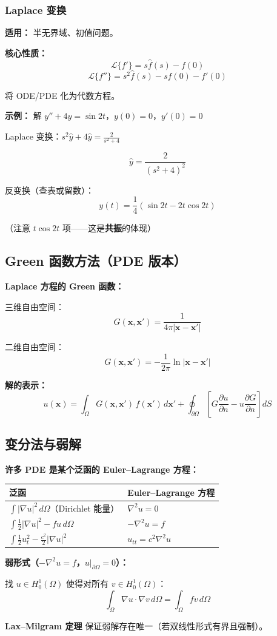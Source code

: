 \subsubsection{Laplace 变换}

\textbf{适用：} 半无界域、初值问题。

\textbf{核心性质：}
\[
\mathcal{L}\{f'\} = s\hat{f}(s) - f(0)
\]
\[
\mathcal{L}\{f''\} = s^2\hat{f}(s) - sf(0) - f'(0)
\]

将 ODE/PDE 化为代数方程。

\textbf{示例：} 解 $y'' + 4y = \sin 2t$，$y(0) = 0$，$y'(0) = 0$

Laplace 变换：$s^2\hat{y} + 4\hat{y} = \frac{2}{s^2+4}$

\[
\hat{y} = \frac{2}{(s^2+4)^2}
\]

反变换（查表或留数）：
\[
\boxed{y(t) = \frac{1}{4}(\sin 2t - 2t\cos 2t)}
\]

（注意 $t\cos 2t$ 项——这是\textbf{共振}的体现）

\subsection{Green 函数方法（PDE 版本）}

\textbf{Laplace 方程的 Green 函数：}

三维自由空间：
\[
G(\mathbf{x}, \mathbf{x}') = \frac{1}{4\pi|\mathbf{x} - \mathbf{x}'|}
\]

二维自由空间：
\[
G(\mathbf{x}, \mathbf{x}') = -\frac{1}{2\pi}\ln|\mathbf{x} - \mathbf{x}'|
\]

\textbf{解的表示：}
\[
u(\mathbf{x}) = \int_\Omega G(\mathbf{x},\mathbf{x}')\,f(\mathbf{x}')\,d\mathbf{x}' + \oint_{\partial\Omega}\left[G\frac{\partial u}{\partial n} - u\frac{\partial G}{\partial n}\right]dS
\]

\subsection{变分法与弱解}

\textbf{许多 PDE 是某个泛函的 Euler--Lagrange 方程：}

\begin{center}
\begin{tabular}{p{5cm}p{5cm}}
\toprule
\textbf{泛函} & \textbf{Euler--Lagrange 方程} \\
\midrule
$\int |\nabla u|^2\,d\Omega$（Dirichlet 能量） & $\nabla^2 u = 0$ \\
$\int \frac{1}{2}|\nabla u|^2 - fu\,d\Omega$ & $-\nabla^2 u = f$ \\
$\int \frac{1}{2}u_t^2 - \frac{c^2}{2}|\nabla u|^2$ & $u_{tt} = c^2\nabla^2 u$ \\
\bottomrule
\end{tabular}
\end{center}

\textbf{弱形式（$-\nabla^2 u = f$，$u|_{\partial\Omega} = 0$）：}

找 $u \in H_0^1(\Omega)$ 使得对所有 $v \in H_0^1(\Omega)$：
\[
\int_\Omega \nabla u \cdot \nabla v\,d\Omega = \int_\Omega fv\,d\Omega
\]

\textbf{Lax--Milgram 定理} 保证弱解存在唯一（若双线性形式有界且强制）。